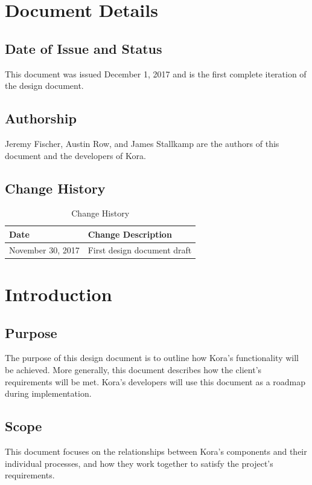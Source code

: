 \documentclass[onecolumn, draftclsnofoot,10pt, compsoc]{IEEEtran}
\def \botname{Kora\xspace}
\begin{document}
\section{Document Details}
	\subsection{Date of Issue and Status}
		This document was issued December 1, 2017 and is the first complete iteration of the design document.

	\subsection{Authorship}
		Jeremy Fischer, Austin Row, and James Stallkamp are the authors of this document and the developers of \botname.
		
	\subsection{Change History}
		\begin{table}[H]
			\centering
			\caption{Change History}
			\label{my-label}
			\begin{tabular}{|l|l|}
				\hline
				\textbf{Date}     & \textbf{Change Description}   \\ \hline
				November 30, 2017 & {First design document draft} \\ \hline
			\end{tabular}
		\end{table}

\section{Introduction}
	\subsection{Purpose}
		The purpose of this design document is to outline how \botname's functionality will be achieved.
		More generally, this document describes how the client's requirements will be met.
		\botname's developers will use this document as a roadmap during implementation.

	\subsection{Scope}
		This document focuses on the relationships between \botname's components and their individual processes, and how they work together to satisfy the project's requirements.
	
\end{document}
